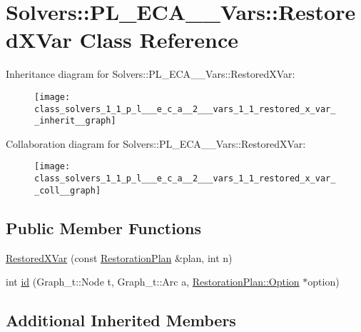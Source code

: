 \hypertarget{class_solvers_1_1_p_l___e_c_a__2___vars_1_1_restored_x_var}{}\section{Solvers\+:\+:P\+L\+\_\+\+E\+C\+A\+\_\+\_\+\+Vars\+:\+:Restored\+X\+Var Class Reference}
\label{class_solvers_1_1_p_l___e_c_a__2___vars_1_1_restored_x_var}


Inheritance diagram for Solvers\+:\+:P\+L\+\_\+\+E\+C\+A\+\_\+\_\+\+Vars\+:\+:Restored\+X\+Var\+:\nopagebreak
\begin{figure}[H]
\begin{center}
\leavevmode
\texttt{[image: class\_solvers\_1\_1\_p\_l\_\_\_e\_c\_a\_\_2\_\_\_vars\_1\_1\_restored\_x\_var\_\_inherit\_\_graph]}
\end{center}
\end{figure}


Collaboration diagram for Solvers\+:\+:P\+L\+\_\+\+E\+C\+A\+\_\+\_\+\+Vars\+:\+:Restored\+X\+Var\+:\nopagebreak
\begin{figure}[H]
\begin{center}
\leavevmode
\texttt{[image: class\_solvers\_1\_1\_p\_l\_\_\_e\_c\_a\_\_2\_\_\_vars\_1\_1\_restored\_x\_var\_\_coll\_\_graph]}
\end{center}
\end{figure}
\subsection*{Public Member Functions}
\begin{DoxyCompactItemize}
\item 
\hyperlink{class_solvers_1_1_p_l___e_c_a__2___vars_1_1_restored_x_var_a682003d690eb9fc6ec1d6ac8056c696b}{Restored\+X\+Var} (const \hyperlink{class_restoration_plan}{Restoration\+Plan} \&plan, int n)
\item 
int \hyperlink{class_solvers_1_1_p_l___e_c_a__2___vars_1_1_restored_x_var_af3514307162d916aee89a45d294c7e3d}{id} (Graph\+\_\+t\+::\+Node t, Graph\+\_\+t\+::\+Arc a, \hyperlink{class_restoration_plan_1_1_option}{Restoration\+Plan\+::\+Option} $\ast$option)
\end{DoxyCompactItemize}
\subsection*{Additional Inherited Members}


